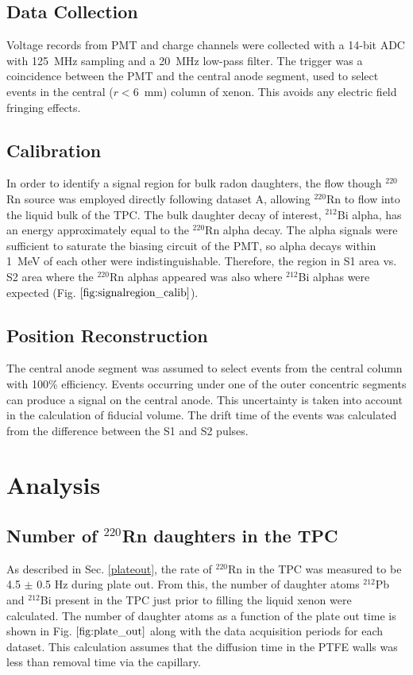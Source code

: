 \subsection{Data Collection}
\label{datacollection}
Voltage records from PMT and charge channels were collected with a 14-bit ADC with 125~MHz sampling and a 20~MHz low-pass filter. The trigger was a coincidence between the PMT and the central anode segment, used to select events in the central ($r<6$~mm) column of xenon. This avoids any electric field fringing effects. %

\subsection{Calibration}
In order to identify a signal region for bulk radon daughters, the flow though $^{220}$Rn source was employed directly following dataset A, allowing $^{220}$Rn to flow into the liquid bulk of the TPC. The bulk daughter decay of interest, $^{212}$Bi alpha, has an energy approximately equal to the $^{220}$Rn alpha decay. The alpha signals were sufficient to saturate the biasing circuit of the PMT, so alpha decays within 1~MeV of each other were indistinguishable. Therefore, the region in S1 area vs. S2 area where the $^{220}$Rn alphas appeared was also where $^{212}$Bi alphas were expected (Fig. $\ref{fig:signalregion_calib}$).

\subsection{Position Reconstruction}
The central anode segment was assumed to select events from the central column with 100\% efficiency. Events occurring under one of the outer concentric segments can produce a signal on the central anode. This uncertainty is taken into account in the calculation of fiducial volume.
The drift time of the events was calculated from the difference between the S1 and S2 pulses.

\section{Analysis}
\label{S:3}

\subsection{Number of $^{220}$Rn daughters in the TPC}
As described in Sec. \ref{plateout}, the rate of $^{220}$Rn in the TPC was measured to be 4.5 $\pm$ 0.5 Hz during  plate out. From this, the number of daughter atoms $^{212}$Pb and $^{212}$Bi present in the TPC just prior to filling the liquid xenon were calculated. The number of daughter atoms as a function of the plate out time is shown in Fig. $\ref{fig:plate_out}$ along with the data acquisition periods for each dataset. This calculation assumes that the diffusion time in the PTFE walls was less than removal time via the capillary.

